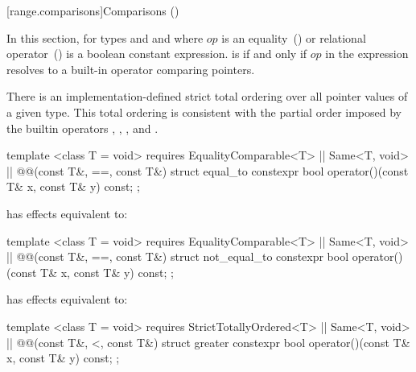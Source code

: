 {\color{addclr}
\setcounter{subsection}{7}
[range.comparisons]{Comparisons ()}

\pnum
{}

\pnum
In this section,  for types 
and  and where $op$ is an equality~() or relational
operator~() is a boolean constant expression.
 is  if and only if $op$
in the expression  resolves to a built-in
operator comparing pointers.

\pnum
There is an implementation-defined strict total ordering over all pointer values
of a given type. This total ordering is consistent with the partial order imposed
by the builtin operators \tcode{<}, \tcode{>}, \tcode{<=}, and \tcode{>=}.

%
\begin{itemdecl}
template <class T = void>
  requires EqualityComparable<T> || Same<T, void> || @\textit{}@(const T&, ==, const T&)
struct equal_to {
  constexpr bool operator()(const T& x, const T& y) const;
};
\end{itemdecl}

\begin{itemdescr}
\pnum
{} has effects equivalent to: 
\end{itemdescr}

%
\begin{itemdecl}
template <class T = void>
  requires EqualityComparable<T> || Same<T, void> || @\textit{}@(const T&, ==, const T&)
struct not_equal_to {
  constexpr bool operator()(const T& x, const T& y) const;
};
\end{itemdecl}

\begin{itemdescr}
\pnum
{} has effects equivalent to: 
\end{itemdescr}

%
\begin{itemdecl}
template <class T = void>
  requires StrictTotallyOrdered<T> || Same<T, void> || @\textit{}@(const T&, <, const T&)
struct greater {
  constexpr bool operator()(const T& x, const T& y) const;
};
\end{itemdecl}

}
